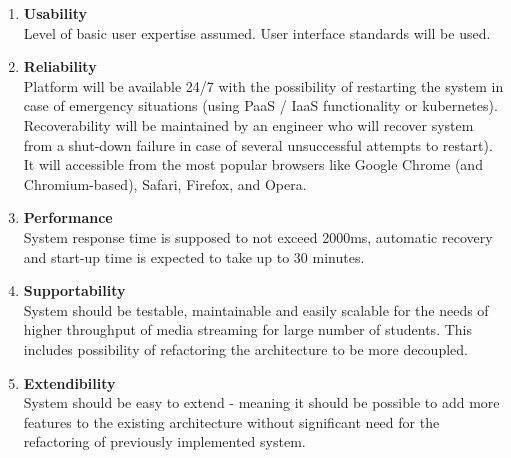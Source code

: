 \documentclass[a4paper,11pt,twoside]{report}
\theoremstyle{definition}
\begin{document}
\begin{enumerate}
\itemsep 0em 
    \item \textbf{Usability} \\
     Level of basic user expertise assumed. User interface standards will be used.
    \item \textbf{Reliability} \\
      Platform will be available 24/7 with the possibility of restarting the system in case of emergency situations (using PaaS / IaaS functionality or kubernetes). Recoverability will be maintained by an engineer who will recover system from a shut-down failure in case of several unsuccessful attempts to restart). It will accessible from the most popular browsers like Google Chrome (and Chromium-based), Safari, Firefox, and Opera.

    \item \textbf{Performance} \\
     System response time is supposed to not exceed 2000ms, automatic recovery and start-up time is expected to take up to 30 minutes. 
     
    \item \textbf{Supportability} \\
     System should be testable, maintainable and easily scalable for the needs of higher throughput of media streaming for large number of students. This includes possibility of refactoring the architecture to be more decoupled. 
     
     \item \textbf{Extendibility} \\ 
     System should be easy to extend - meaning it should be possible to add more features to the existing architecture without significant need for the refactoring of previously implemented system. 
     
\end{enumerate}
\end{document}
